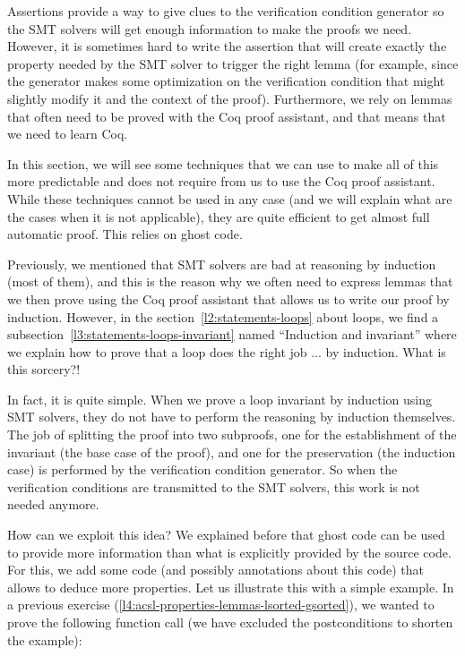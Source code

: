Assertions provide a way to give clues to the verification condition generator
so the SMT solvers will get enough information to make the proofs we
need. However, it is sometimes hard to write the assertion that will
create exactly the property needed by the SMT solver to trigger the right lemma
(for example, since the generator makes some optimization on the verification
condition that might slightly modify it and the context of the proof).
Furthermore, we rely on lemmas that often need to be proved with the Coq proof
assistant, and that means that we need to learn Coq.



In this section, we will see some techniques that we can use to make all of this
more predictable and does not require from us to use the Coq proof assistant.
While these techniques cannot be used in any case (and we will explain what are
the cases when it is not applicable), they are quite efficient to get almost
full automatic proof. This relies on ghost code.






Previously, we mentioned that SMT solvers are bad at reasoning by induction
(most of them), and this is the reason why we often need to express lemmas that
we then prove using the Coq proof assistant that allows us to write our proof
by induction. However, in the section~\ref{l2:statements-loops} about loops, we
find a subsection~\ref{l3:statements-loops-invariant} named ``Induction and
invariant'' where we explain how to prove that a loop does the right job ... by
induction. What is this sorcery?!




In fact, it is quite simple. When we prove a loop invariant by induction using
SMT solvers, they do not have to perform the reasoning by induction themselves.
The job of splitting the proof into two subproofs, one for the establishment of
the invariant (the base case of the proof), and one for the preservation (the
induction case) is performed by the verification condition generator. So when
the verification conditions are transmitted to the SMT solvers, this work is not
needed anymore.




How can we exploit this idea? We explained before that ghost code can be used to
provide more information than what is explicitly provided by the source code.
For this, we add some code (and possibly annotations about this code) that
allows to deduce more properties. Let us illustrate this with a simple example.
In a previous exercise (\ref{l4:acsl-properties-lemmas-lsorted-gsorted}), we
wanted to prove the following function call (we have excluded the postconditions
to shorten the example):



